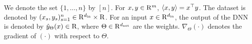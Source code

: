 We denote the set $\{1,\ldots, n\}$ by $[n]$. For $x,y\in\mathrm{R}^m$, $\langle x,y\rangle=x^\top y$. The dataset is denoted by $(x_s,y_s)_{s=1}^n\in\mathrm{R}^{d_{\text{in}}}\times \mathrm{R}$. For an input $x\in\mathrm{R}^{d_{\text{in}}}$, the output of the DNN  is denoted by $\hat{y}_{\Theta}(x)\in\mathrm{R}$, where $\Theta\in\mathrm{R}^{d_{\text{net}}}$ are the weights. $\nabla_{\Theta}(\cdot)$ denotes the gradient of $(\cdot)$ with respect to $\Theta$. 